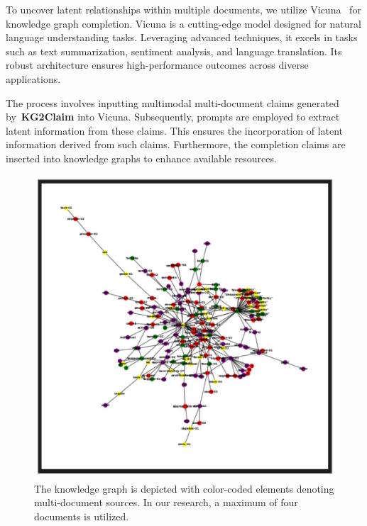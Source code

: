 To uncover latent relationships within multiple documents, we utilize Vicuna~\cite{vicuna2023} for knowledge graph completion. Vicuna is a cutting-edge model designed for natural language understanding tasks. Leveraging advanced techniques, it excels in tasks such as text summarization, sentiment analysis, and language translation. Its robust architecture ensures high-performance outcomes across diverse applications.

The process involves inputting multimodal multi-document claims generated by~\textbf{KG2Claim} into Vicuna. Subsequently, prompts are employed to extract latent information from these claims. This ensures the incorporation of latent information derived from such claims. Furthermore, the completion claims are inserted into knowledge graphs to enhance available resources.

\begin{figure}
\centering\includegraphics[width=\textwidth,height=\textwidth,keepaspectratio]{images/11.jpg}
  \caption{The knowledge graph is depicted with color-coded elements denoting multi-document sources. In our research, a maximum of four documents is utilized.}
  \label{fig:visulization}
\end{figure}